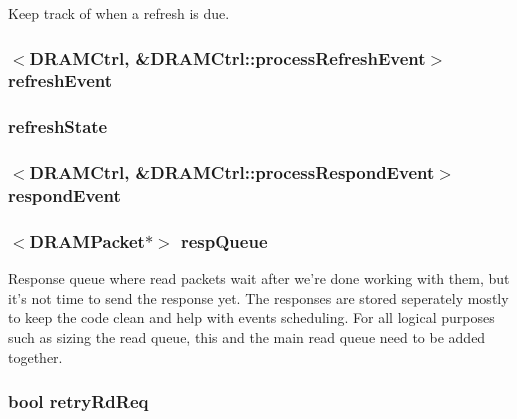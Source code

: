 \label{classDRAMCtrl_adee1f5c3afbe3ccf89880cde10ff9478}
Keep track of when a refresh is due. \hypertarget{classDRAMCtrl_a0bc8ce4f4a849871eb32bd983b5d2843}{
\subsubsection[{refreshEvent}]{$<${\bf DRAMCtrl}, \&DRAMCtrl::processRefreshEvent$>$ {\bf refreshEvent}}}
\label{classDRAMCtrl_a0bc8ce4f4a849871eb32bd983b5d2843}
\hypertarget{classDRAMCtrl_aa74cbca6192755f3cec9950a97c90342}{
\subsubsection[{refreshState}]{ {\bf refreshState}}}
\label{classDRAMCtrl_aa74cbca6192755f3cec9950a97c90342}
\hypertarget{classDRAMCtrl_a31bec941f92f261930a6df5cf9fb166e}{
\subsubsection[{respondEvent}]{$<${\bf DRAMCtrl}, \&DRAMCtrl::processRespondEvent$>$ {\bf respondEvent}}}
\label{classDRAMCtrl_a31bec941f92f261930a6df5cf9fb166e}
\hypertarget{classDRAMCtrl_a04637ab08ad048aa826537a67dba4654}{
\subsubsection[{respQueue}]{$<${\bf DRAMPacket}$\ast$$>$ {\bf respQueue}}}
\label{classDRAMCtrl_a04637ab08ad048aa826537a67dba4654}
Response queue where read packets wait after we're done working with them, but it's not time to send the response yet. The responses are stored seperately mostly to keep the code clean and help with events scheduling. For all logical purposes such as sizing the read queue, this and the main read queue need to be added together. \hypertarget{classDRAMCtrl_aa4e05579e39e0e1ae7859ddba8538932}{
\subsubsection[{retryRdReq}]{\setlength{\rightskip}{0pt plus 5cm}bool {\bf retryRdReq}}}
